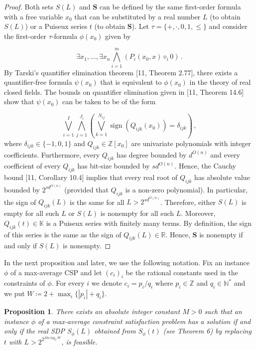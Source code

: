 \documentclass[10pt,a4paper]{article}
\newtheorem{proposition}[theorem]{Proposition}
\theoremstyle{definition}
\begin{document}
\begin{proof}
Both sets $S(L)$ and $\bm{S}$ can be defined by the same first-order formula with a free variable $x_{0}$ that can be substituted by a real number $L$ (to obtain $S(L)$) or a Puiseux series $t$ (to obtain $\bm{S}$). Let $\tau=\{+,\cdot,0,1,\leq\}$ and consider the first-order $\tau$-formula $\phi(x_{0})$ given by


\[
\exists x_{1},\dots,\exists x_{n}\operatorname*{\bigwedge}_{i=1}^{m}(P_{i}(x_{0},x)\diamond_{i}0)\,.
\]
By Tarski’s quantifier elimination theorem [11, Theorem 2.77], there exists a quantifier-free formula $\psi(x_{0})$ that is equivalent to $\phi(x_{0})$ in the theory of real closed fields. The bounds on quantifier elimination given in [11, Theorem 14.6] show that $\psi(x_{0})$ can be taken to be of the form


\[
\operatorname*{\bigvee}_{i=1}^{I}\operatorname*{\bigwedge}_{j=1}^{J_{i}}\left(\operatorname*{\bigvee}_{k=1}^{N_{ij}}\operatorname*{\mathrm{sign}}(Q_{ijk}(x_{0}))=\delta_{ijk}\right)\,,
\]
where $\delta_{ijk}\in\{-1,0,1\}$ and $Q_{ijk}\in\mathbb{Z}[x_{0}]$ are univariate polynomials with integer coefficients. Furthermore, every $Q_{ijk}$ has degree bounded by $d^{O(n)}$ and every coefficient of every $Q_{ijk}$ has bit-size bounded by $sd^{O(n)}$. Hence, the Cauchy bound [11, Corollary 10.4] implies that every real root of $Q_{ijk}$ has absolute value bounded by $2^{sd^{O(n)}}$ (provided that $Q_{ijk}$ is a non-zero polynomial). In particular, the sign of $Q_{ijk}(L)$ is the same for all $L>2^{sd^{O(n)}}$. Therefore, either $S(L)$ is empty for all such $L$ or $S(L)$ is nonempty for all such $L$. Moreover, $Q_{ijk}(t)\in\mathbb{K}$ is a Puiseux series with finitely many terms. By definition, the sign of this series is the same as the sign of $Q_{ijk}(L)\in\mathbb{R}$. Hence, $\bm{S}$ is nonempty if and only if $S(L)$ is nonempty. 

\end{proof}
In the next proposition and later, we use the following notation. Fix an instance $\phi$ of a max-average CSP and let $(c_{i})_{i}$ be the rational constants used in the constraints of $\phi$. For every $i$ we denote $c_{i}=p_{i}/q_{i}$ where $p_{i}\in\mathbb{Z}$ and $q_{i}\in\mathbb{N}^{*}$ and we put $W\coloneqq 2+\max_{i}\{|p_{i}|+q_{i}\}$.

\setcounter{theorem}{7}
\begin{proposition}\label{Thmtheorem8}
There exists an absolute integer constant $M>0$ such that an instance $\phi$ of a max-average constraint satisfaction problem has a solution if and only if the real SDP $S_{\phi}(L)$ obtained from $S_{\phi}(t)$ (see Theorem 6) by replacing $t$ with $L>2^{2^{Mn\log_{2}W}}$, is feasible.

\end{proposition}
\end{document}
